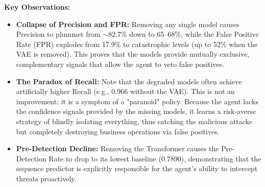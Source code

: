 \begin{table}[H]
    \centering
    \caption{Ablation Study: Impact of Removing Individual Perception Models}
    \label{tab:ablation_results}
\end{table}

\textbf{Key Observations:}
\begin{itemize}
    \item \textbf{Collapse of Precision and FPR:} Removing any single model causes Precision to plummet from $\sim$82.7\% down to 65--68\%, while the False Positive Rate (FPR) explodes from 17.9\% to catastrophic levels (up to 52\% when the VAE is removed). This proves that the models provide mutually exclusive, complementary signals that allow the agent to veto false positives.
    \item \textbf{The Paradox of Recall:} Note that the degraded models often achieve artificially higher Recall (e.g., 0.966 without the VAE). This is not an improvement; it is a symptom of a "paranoid" policy. Because the agent lacks the confidence signals provided by the missing models, it learns a risk-averse strategy of blindly isolating everything, thus catching the malicious attacks but completely destroying business operations via false positives.
    \item \textbf{Pre-Detection Decline:} Removing the Transformer causes the Pre-Detection Rate to drop to its lowest baseline (0.7890), demonstrating that the sequence predictor is explicitly responsible for the agent's ability to intercept threats proactively.
\end{itemize}

